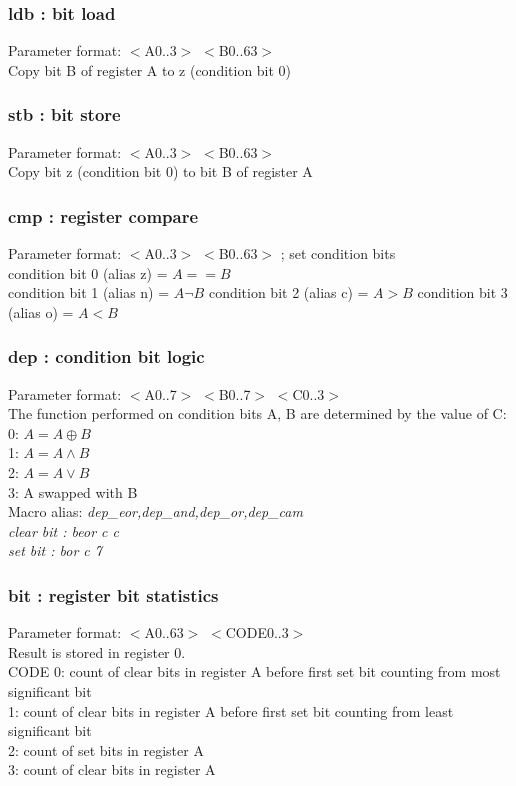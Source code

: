 \documentclass[a4paper,11pt]{article}
\begin{document}
\subsubsection{ldb : bit load} 
 Parameter format: $<$A0..3$>$ $<$B0..63$>$\\
 Copy bit B of register A to z (condition bit 0)

\subsubsection{stb : bit store} 
 Parameter format: $<$A0..3$>$ $<$B0..63$>$\\
 Copy bit z (condition bit 0) to bit B of register A

\subsubsection{cmp : register compare} 
 Parameter format: $<$A0..3$>$ $<$B0..63$>$ ; set condition bits\\
 condition bit 0 (alias z) = $A==B$\\
 condition bit 1 (alias n) = $A\neg B$
 condition bit 2 (alias c) = $A>B$
 condition bit 3 (alias o) = $A<B$
 
\subsubsection{dep : condition bit logic} 
 Parameter format: $<$A0..7$>$ $<$B0..7$>$ $<$C0..3$>$\\
 
 The function performed on condition bits A, B are determined by the value of C:\\
 0: $A = A \oplus B$\\
 1: $A = A \wedge B$\\
 2: $A = A \vee B$\\
 3: A swapped with B\\

Macro alias: \sl dep\_eor,dep\_and,dep\_or,dep\_cam \rm\\
 clear bit : beor c c\\
 set bit : bor c 7

\subsubsection{bit : register bit statistics} 
 Parameter format: $<$A0..63$>$ $<$CODE0..3$>$\\
 Result is stored in register 0.\\
 CODE 0: count of clear bits in register A before first set bit counting from most significant bit\\
      1: count of clear bits in register A before first set bit counting from least significant bit\\
      2: count of set bits in register A\\
      3: count of clear bits in register A\\
 
\end{document}
